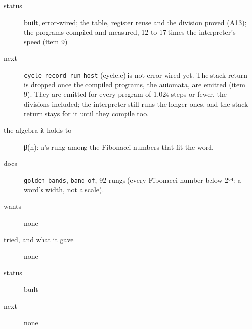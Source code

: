 \begin{description}
\item[{status}] built, error-wired; the table, register reuse and the division proved (A13); the programs compiled and measured, 12 to 17 times the interpreter's speed (item 9)
\item[{next}] \texttt{cycle\_\allowbreak{}record\_\allowbreak{}run\_\allowbreak{}host} (cycle.c) is not error-wired yet. The stack return is dropped once the compiled programs, the automata, are emitted (item 9). They are emitted for every program of 1,024 steps or fewer, the divisions included; the interpreter still runs the longer ones, and the stack return stays for it until they compile too.
\end{description}

\begin{description}
\item[{the algebra it holds to}] β(n): n's rung among the Fibonacci numbers that fit the word.
\item[{does}] \texttt{golden\_\allowbreak{}bands}, \texttt{band\_\allowbreak{}of}, 92 rungs (every Fibonacci number below 2⁶⁴: a word's width, not a scale).
\item[{wants}] none
\item[{tried, and what it gave}] none
\item[{status}] built
\item[{next}] none
\end{description}

